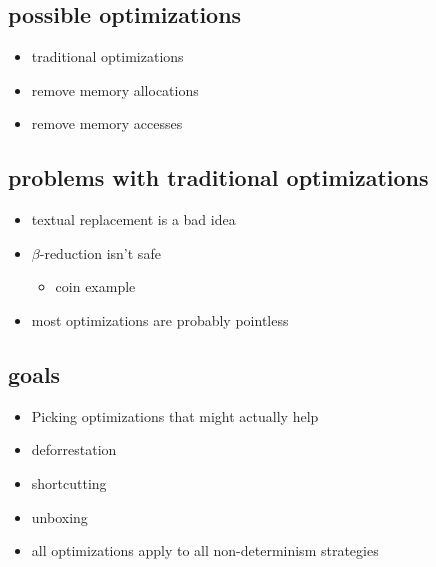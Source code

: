 
\subsection{possible optimizations}
\begin{itemize}
  \item traditional optimizations
  \item remove memory allocations
  \item remove memory accesses
\end{itemize}
\subsection{problems with traditional optimizations}
\begin{itemize}
  \item textual replacement is a bad idea
  \item $\beta$-reduction isn't safe
  \begin{itemize}
      \item coin example
  \end{itemize}
  \item most optimizations are probably pointless
\end{itemize}
\subsection{goals}
\begin{itemize}
    \item Picking optimizations that might actually help
    \item deforrestation
    \item shortcutting
    \item unboxing
    \item all optimizations apply to all non-determinism strategies
\end{itemize}
